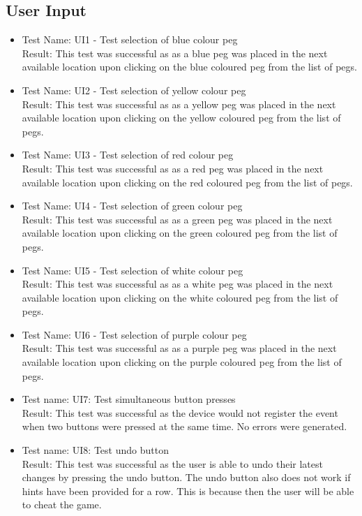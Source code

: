 \documentclass[12pt, titlepage]{article}
\begin{document}
\subsection{User Input}
\begin{itemize}
  \item Test Name: UI1 - Test selection of blue colour peg\\
        Result: This test was successful as as a blue peg was placed in the next available location upon clicking on the blue coloured peg from the list of pegs.
    \item Test Name: UI2 - Test selection of yellow colour peg\\
        Result: This test was successful as as a yellow peg was placed in the next available location upon clicking on the yellow coloured peg from the list of pegs.
    \item Test Name: UI3 - Test selection of red colour peg\\
        Result: This test was successful as as a red peg was placed in the next available location upon clicking on the red coloured peg from the list of pegs.
    \item Test Name: UI4 - Test selection of green colour peg\\
        Result: This test was successful as as a green peg was placed in the next available location upon clicking on the green coloured peg from the list of pegs.
    \item Test Name: UI5 - Test selection of white colour peg\\
        Result: This test was successful as as a white peg was placed in the next available location upon clicking on the white coloured peg from the list of pegs.
    \item Test Name: UI6 - Test selection of purple colour peg\\
        Result: This test was successful as as a purple peg was placed in the next available location upon clicking on the purple coloured peg from the list of pegs.
    \item Test name: UI7: Test simultaneous button presses \\
        Result: This test was successful as the device would not register the event when two buttons were pressed at the same time. No errors were generated.
    \item Test name: UI8: Test undo button \\
        Result: This test was successful as the user is able to undo their latest changes by pressing the undo button. The undo button also does not work if hints have been provided for a row. This is because then the user will be able to cheat the game.

\end{itemize}
\end{document}
